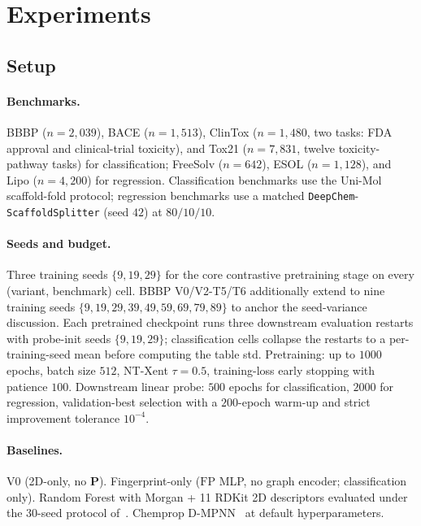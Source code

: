 
\section{Experiments}
\label{sec:experiments}

\subsection{Setup}
\paragraph{Benchmarks.} BBBP ($n{=}2{,}039$), BACE ($n{=}1{,}513$),
ClinTox ($n{=}1{,}480$, two tasks: FDA approval and clinical-trial
toxicity), and Tox21 ($n{=}7{,}831$, twelve toxicity-pathway tasks) for
classification; FreeSolv ($n{=}642$), ESOL ($n{=}1{,}128$), and Lipo
($n{=}4{,}200$) for regression. Classification benchmarks use the Uni-Mol
scaffold-fold protocol; regression benchmarks use a matched
\texttt{DeepChem}-\texttt{ScaffoldSplitter} (seed $42$) at $80/10/10$.

\paragraph{Seeds and budget.} Three training seeds $\{9,19,29\}$ for the
core contrastive pretraining stage on every (variant, benchmark) cell.
BBBP V0/V2-T5/T6 additionally extend to nine training seeds
$\{9,19,29,39,49,59,69,79,89\}$ to anchor the seed-variance discussion.
Each pretrained checkpoint runs three downstream evaluation restarts with
probe-init seeds $\{9,19,29\}$; classification cells collapse the
restarts to a per-training-seed mean before computing the table std.
Pretraining: up to $1000$ epochs, batch size $512$, NT-Xent
$\tau{=}0.5$, training-loss early stopping with patience $100$. Downstream
linear probe: $500$ epochs for classification, $2000$ for regression,
validation-best selection with a $200$-epoch warm-up and strict
improvement tolerance $10^{-4}$.

\paragraph{Baselines.} V0 (2D-only, no $\mathbf{P}$). Fingerprint-only
($\mathrm{FP}$ MLP, no graph encoder; classification only). Random Forest
with Morgan + 11 RDKit 2D descriptors evaluated under the 30-seed
protocol of~\cite{deng2023systematic}. Chemprop
D-MPNN~\cite{yang2019chemprop} at default hyperparameters.

